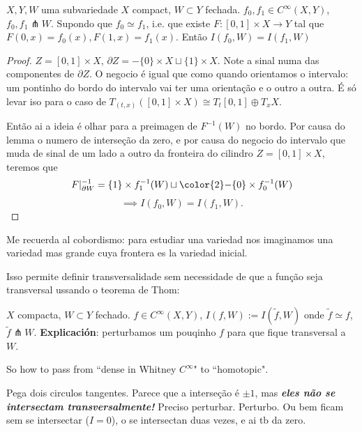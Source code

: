 \begin{thm}\leavevmode
	\(X,Y,W\) uma subvariedade \(X \) compact, \(W \subset Y\) fechada. \(f_0,f_1 \in C^\infty(X,Y)\), \(f_0,f_1\pitchfork W\). Supondo que \(f_0 \simeq f_1\), i.e. que existe \(F:[0,1] \times X \to Y\) tal que \(F(0,x)=f_0(x), F(1,x)=f_1(x)\). Então \(I(f_0,W)=I(f_1,W)\)
\end{thm}

\begin{proof}\leavevmode
	\(Z=[0,1] \times X\), \(\partial Z=-\{0\}\times X \sqcup \{ 1\}\times X\). Note a sinal numa das componentes de \(\partial Z\). O negocio é igual que como quando orientamos o intervalo: um pontinho do bordo do intervalo vai ter uma orientação e o outro a outra. É só levar iso para o caso de \(T_{(t,x)}([0,1] \times X) \cong T_t[0,1] \oplus  T_xX\).

	Então ai a ideia é olhar para a preimagen de \(F^{-1}(W)\) no bordo. Por causa do lemma o numero de interseção da zero, e por causa do negocio do intervalo que muda de sinal de um lado a outro da fronteira do cilindro \(Z=[0,1] \times X\), teremos que
	\[F|_{\partial W}^{-1}=\{1\}\times f^{-1}_1(W) \sqcup {\color{2}-}\{0\} \times f^{-1}_0(W)\]
	\[\implies I(f_0,W) = I(f_1,W).\]
\end{proof}

\begin{remark}[dani]\leavevmode
	Me recuerda al cobordismo: para estudiar una variedad nos imaginamos una variedad mas grande cuya frontera es la variedad inicial.
\end{remark}

Isso permite definir transversalidade sem necessidade de que a função seja transversal ussando o teorema de Thom:

\(X\) compacta, \(W \subset Y\) fechado. \(f \in C^\infty (X,Y)\), \(I(f,W):= I(\tilde{f},W)\) onde \(\tilde{f} \simeq f\), \(\tilde{f} \pitchfork  W\). \textbf{Explicación}: perturbamos um pouqinho \(f\) para que fique transversal a \(W\).

\begin{remark}[dani]\leavevmode
So how to pass from ``dense in Whitney \(C^\infty\)" to ``homotopic".
\end{remark}

\begin{example}\leavevmode
	Pega dois circulos tangentes. Parece que a interseção é \(\pm  1\), mas \textit{\textbf{eles não se intersectam transversalmente!}} Preciso perturbar. Perturbo. Ou bem ficam sem se intersectar (\(I=0\)), o se intersectan duas vezes, e ai tb da zero.
\end{example}


